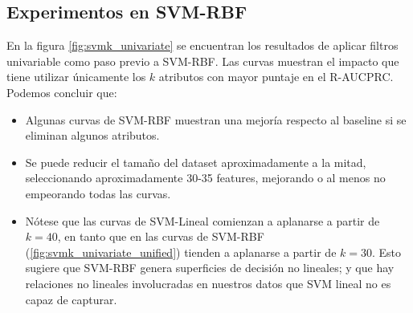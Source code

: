 \subsection{Experimentos en SVM-RBF}

En la figura \ref{fig:svmk_univariate} se encuentran los resultados de aplicar filtros univariable como paso previo a SVM-RBF. Las curvas muestran el impacto que tiene utilizar únicamente los $k$ atributos con mayor puntaje en el R-AUCPRC. Podemos concluir que:

\begin{itemize}
\item Algunas curvas de SVM-RBF muestran una mejoría respecto al baseline si se eliminan algunos atributos. 
\item Se puede reducir el tamaño del dataset aproximadamente a la mitad, seleccionando aproximadamente 30-35 features, mejorando o al menos no empeorando todas las curvas. 
\item Nótese que las curvas de SVM-Lineal comienzan a aplanarse a partir de $k=40$, en tanto que en las curvas de SVM-RBF (\ref{fig:svmk_univariate_unified}) tienden a aplanarse a partir de $k=30$. Esto sugiere que SVM-RBF genera superficies de decisión no lineales; y que hay relaciones no lineales involucradas en nuestros datos que SVM lineal no es capaz de capturar.
\end{itemize}

